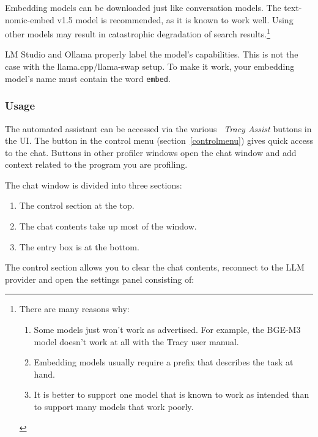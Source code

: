 \documentclass[hidelinks,titlepage,a4paper,twoside]{article}
\begin{document}
Embedding models can be downloaded just like conversation models. The text-nomic-embed v1.5 model is recommended, as it is known to work well. Using other models may result in catastrophic degradation of search results.\footnote{There are many reasons why:
\begin{enumerate}
\item Some models just won't work as advertised. For example, the BGE-M3 model doesn't work at all with the Tracy user manual.
\item Embedding models usually require a prefix that describes the task at hand.
\item It is better to support one model that is known to work as intended than to support many models that work poorly.
\end{enumerate}
}

LM Studio and Ollama properly label the model's capabilities. This is not the case with the llama.cpp/llama-swap setup. To make it work, your embedding model's name must contain the word \texttt{embed}.

\subsubsection{Usage}

The automated assistant can be accessed via the various \emph{\faRobot{}~Tracy Assist} buttons in the UI. The button in the control menu (section~\ref{controlmenu}) gives quick access to the chat. Buttons in other profiler windows open the chat window and add context related to the program you are profiling.

The chat window is divided into three sections:

\begin{enumerate}
\item The control section at the top.
\item The chat contents take up most of the window.
\item The entry box is at the bottom.
\end{enumerate}

The control section allows you to clear the chat contents, reconnect to the LLM provider and open the settings panel consisting of:
\end{document}
